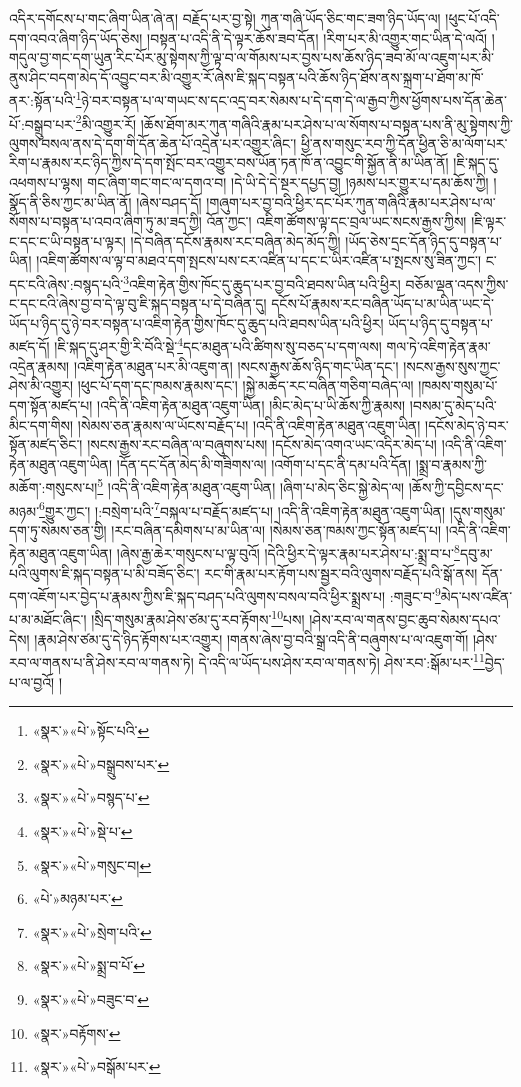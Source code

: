 འདིར་དགོངས་པ་གང་ཞིག་ཡིན་ཞེ་ན། བརྗོད་པར་བྱ་སྟེ། ཀུན་གཞི་ཡོད་ཅིང་གང་ཟག་ཉིད་ཡོད་ལ། །ཕུང་པོ་འདི་དག་འབའ་ཞིག་ཉིད་ཡོད་ཅེས། །བསྟན་པ་འདི་ནི་དེ་ལྟར་ཆོས་ཟབ་དོན། །རིག་པར་མི་འགྱུར་གང་ཡིན་དེ་ལའོ། །གདུལ་བྱ་གང་དག་ཡུན་རིང་པོར་མུ་སྟེགས་ཀྱི་ལྟ་བ་ལ་གོམས་པར་བྱས་པས་ཆོས་ཉིད་ཟབ་མོ་ལ་འཇུག་པར་མི་ནུས་ཤིང་བདག་མེད་དོ་འབྱུང་བར་མི་འགྱུར་རོ་ཞེས་ཇི་སྐད་བསྟན་པའི་ཆོས་ཉིད་ཐོས་ནས་སྐྲག་པ་ཐོག་མ་ཁོ་ནར་:སྟོན་པའི་\footnote{«སྣར་»«པེ་»སྟོང་པའི་}ཉེ་བར་བསྟན་པ་ལ་གཡང་ས་དང་འདྲ་བར་སེམས་པ་དེ་དག་དེ་ལ་རྒྱབ་ཀྱིས་ཕྱོགས་པས་དོན་ཆེན་པོ་:བསྒྲུབ་པར་\footnote{«སྣར་»«པེ་»བསྒྲུབས་པར་}མི་འགྱུར་རོ། །ཆོས་ཐོག་མར་ཀུན་གཞིའི་རྣམ་པར་ཤེས་པ་ལ་སོགས་པ་བསྟན་པས་ནི་མུ་སྟེགས་ཀྱི་ལུགས་བསལ་ནས་དེ་དག་གི་དོན་ཆེན་པོ་འདྲེན་པར་འགྱུར་ཞིང་། ཕྱི་ནས་གསུང་རབ་ཀྱི་དོན་ཕྱིན་ཅི་མ་ལོག་པར་རིག་པ་རྣམས་རང་ཉིད་ཀྱིས་དེ་དག་སྤོང་བར་འགྱུར་བས་ཡོན་ཏན་ཁོ་ན་འབྱུང་གི་སྐྱོན་ནི་མ་ཡིན་ནོ། །ཇི་སྐད་དུ་འཕགས་པ་ལྷས། གང་ཞིག་གང་གང་ལ་དགའ་བ། །དེ་ཡི་དེ་དེ་སྔར་དཔྱད་བྱ། །ཉམས་པར་གྱུར་པ་དམ་ཆོས་ཀྱི། །སྣོད་ནི་ཅིས་ཀྱང་མ་ཡིན་ནོ། །ཞེས་བཤད་དོ། །གཞུག་པར་བྱ་བའི་ཕྱིར་དང་པོར་ཀུན་གཞིའི་རྣམ་པར་ཤེས་པ་ལ་སོགས་པ་བསྟན་པ་འབའ་ཞིག་ཏུ་མ་ཟད་ཀྱི། འོན་ཀྱང་། འཇིག་ཚོགས་ལྟ་དང་བྲལ་ཡང་སངས་རྒྱས་ཀྱིས། །ཇི་ལྟར་ང་དང་ང་ཡི་བསྟན་པ་ལྟར། །དེ་བཞིན་དངོས་རྣམས་རང་བཞིན་མེད་མོད་ཀྱི། །ཡོད་ཅེས་དྲང་དོན་ཉིད་དུ་བསྟན་པ་ཡིན། །འཇིག་ཚོགས་ལ་ལྟ་བ་མཐའ་དག་སྤངས་པས་ངར་འཛིན་པ་དང་ང་ཡིར་འཛིན་པ་སྤངས་སུ་ཟིན་ཀྱང་། ང་དང་ངའི་ཞེས་:བསྙད་པའི་\footnote{«སྣར་»«པེ་»བསྙད་པ་}འཇིག་རྟེན་གྱིས་ཁོང་དུ་ཆུད་པར་བྱ་བའི་ཐབས་ཡིན་པའི་ཕྱིར། བཅོམ་ལྡན་འདས་ཀྱིས་ང་དང་ངའི་ཞེས་བྱ་བ་དེ་ལྟ་བུ་ཇི་སྐད་བསྟན་པ་དེ་བཞིན་དུ། དངོས་པོ་རྣམས་རང་བཞིན་ཡོད་པ་མ་ཡིན་ཡང་དེ་ཡོད་པ་ཉིད་དུ་ཉེ་བར་བསྟན་པ་འཇིག་རྟེན་གྱིས་ཁོང་དུ་ཆུད་པའི་ཐབས་ཡིན་པའི་ཕྱིར། ཡོད་པ་ཉིད་དུ་བསྟན་པ་མཛད་དོ། །ཇི་སྐད་དུ་ཤར་གྱི་རི་བོའི་སྡེ་\footnote{«སྣར་»«པེ་»སྡེ་པ་}དང་མཐུན་པའི་ཚིགས་སུ་བཅད་པ་དག་ལས། གལ་ཏེ་འཇིག་རྟེན་རྣམ་འདྲེན་རྣམས། །འཇིག་རྟེན་མཐུན་པར་མི་འཇུག་ན། །སངས་རྒྱས་ཆོས་ཉིད་གང་ཡིན་དང་། །སངས་རྒྱས་སུས་ཀྱང་ཤེས་མི་འགྱུར། །ཕུང་པོ་དག་དང་ཁམས་རྣམས་དང་། །སྐྱེ་མཆེད་རང་བཞིན་གཅིག་བཞེད་ལ། །ཁམས་གསུམ་པོ་དག་སྟོན་མཛད་པ། །འདི་ནི་འཇིག་རྟེན་མཐུན་འཇུག་ཡིན། །མིང་མེད་པ་ཡི་ཆོས་ཀྱི་རྣམས། །བསམ་དུ་མེད་པའི་མིང་དག་གིས། །སེམས་ཅན་རྣམས་ལ་ཡོངས་བརྗོད་པ། །འདི་ནི་འཇིག་རྟེན་མཐུན་འཇུག་ཡིན། །དངོས་མེད་ཉེ་བར་སྟོན་མཛད་ཅིང་། །སངས་རྒྱས་རང་བཞིན་ལ་བཞུགས་པས། །དངོས་མེད་འགའ་ཡང་འདིར་མེད་པ། །འདི་ནི་འཇིག་རྟེན་མཐུན་འཇུག་ཡིན། །དོན་དང་དོན་མེད་མི་གཟིགས་ལ། །འགོག་པ་དང་ནི་དམ་པའི་དོན། །སྨྲ་བ་རྣམས་ཀྱི་མཆོག་:གསུངས་པ།\footnote{«སྣར་»«པེ་»གསུང་བ།} །འདི་ནི་འཇིག་རྟེན་མཐུན་འཇུག་ཡིན། །ཞིག་པ་མེད་ཅིང་སྐྱེ་མེད་ལ། །ཆོས་ཀྱི་དབྱིངས་དང་མཉམ་\footnote{«པེ་»མཉམ་པར་}གྱུར་ཀྱང་། །:བསྲེག་པའི་\footnote{«སྣར་»«པེ་»སྲེག་པའི་}བསྐལ་པ་བརྗོད་མཛད་པ། །འདི་ནི་འཇིག་རྟེན་མཐུན་འཇུག་ཡིན། །དུས་གསུམ་དག་ཏུ་སེམས་ཅན་གྱི། །རང་བཞིན་དམིགས་པ་མ་ཡིན་ལ། །སེམས་ཅན་ཁམས་ཀྱང་སྟོན་མཛད་པ། །འདི་ནི་འཇིག་རྟེན་མཐུན་འཇུག་ཡིན། །ཞེས་རྒྱ་ཆེར་གསུངས་པ་ལྟ་བུའོ། །དེའི་ཕྱིར་དེ་ལྟར་རྣམ་པར་ཤེས་པ་:སྨྲ་བ་པ་\footnote{«སྣར་»«པེ་»སྨྲ་བ་པོ་}དབུ་མ་པའི་ལུགས་ཇི་སྐད་བསྟན་པ་མི་བཟོད་ཅིང་། རང་གི་རྣམ་པར་རྟོག་པས་སྦྱར་བའི་ལུགས་བརྗོད་པའི་སྒོ་ནས། དོན་དག་འཇོག་པར་བྱེད་པ་རྣམས་ཀྱིས་ཇི་སྐད་བཤད་པའི་ལུགས་བསལ་བའི་ཕྱིར་སྨྲས་པ། :གཟུང་བ་\footnote{«སྣར་»«པེ་»བཟུང་བ་}མེད་པས་འཛིན་པ་མ་མཐོང་ཞིང་། །སྲིད་གསུམ་རྣམ་ཤེས་ཙམ་དུ་རབ་རྟོགས་\footnote{«སྣར་»བརྟོགས་}པས། །ཤེས་རབ་ལ་གནས་བྱང་ཆུབ་སེམས་དཔའ་དེས། །རྣམ་ཤེས་ཙམ་དུ་དེ་ཉིད་རྟོགས་པར་འགྱུར། །གནས་ཞེས་བྱ་བའི་སྒྲ་འདི་ནི་བཞུགས་པ་ལ་འཇུག་གོ། །ཤེས་རབ་ལ་གནས་པ་ནི་ཤེས་རབ་ལ་གནས་ཏེ། དེ་འདི་ལ་ཡོད་པས་ཤེས་རབ་ལ་གནས་ཏེ། ཤེས་རབ་:སྒོམ་པར་\footnote{«སྣར་»«པེ་»བསྒོམ་པར་}བྱེད་པ་ལ་བྱའོ། །
